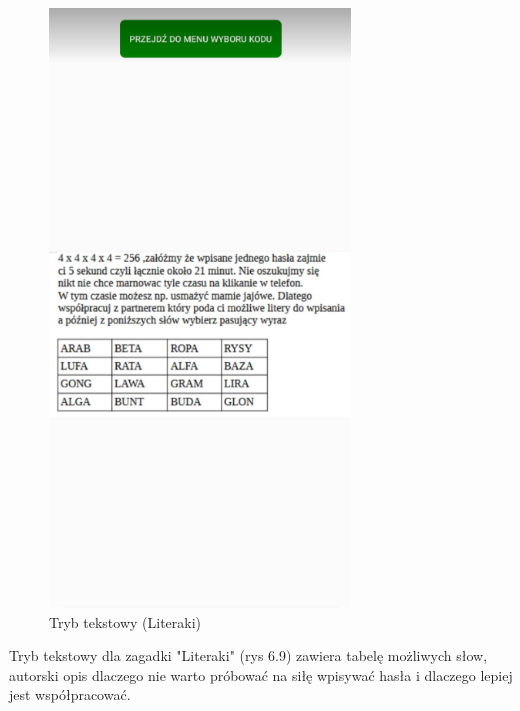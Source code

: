 	\begin{figure}[!htb]
	\begin{center}
		\includegraphics[width=8cm]{rys/tekstowy2.png}
		\caption{Tryb tekstowy (Literaki)}
		\label{rys:rysunek001}
	\end{center}
\end{figure}
\hspace{-0.60cm}Tryb tekstowy dla zagadki "Literaki" (rys 6.9) zawiera tabelę możliwych słow, autorski opis dlaczego nie warto próbować na siłę wpisywać hasła i dlaczego lepiej jest współpracować.
\\
\\
\\
\\
\\
\\
\\
\\
\\
